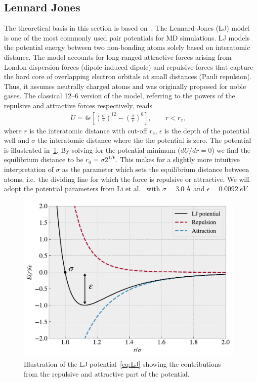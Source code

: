 \subsection{Lennard Jones}\label{sec:LJ}
The theoretical basis in this section is based on~\cite{docs_lammps_LJ,
C9CP05445F, chem_libretexts_LJ}. The Lennard-Jones (\acrshort{LJ}) model is one of the most commonly used pair potentials for \acrshort{MD} simulations. \acrshort{LJ} models the potential energy between two non-bonding atoms solely based on interatomic distance. The model accounts for long-ranged attractive forces arising from London dispersion forces (dipole-induced dipole) and repulsive forces that capture the hard core of overlapping electron orbitals at small distances (Pauli repulsion). Thus, it assumes neutrally charged atoms and was originally proposed for noble gases. The classical 12--6 version of the model, referring to the powers of the repulsive and attractive forces respectively, reads
\begin{align}
  U = 4\epsilon \left[\left(\frac{\sigma}{r}\right)^{12} - \left(\frac{\sigma}{r}\right)^6 \right ], \qquad r < r_c,
  \label{eq:LJ}
\end{align}
where $r$ is the interatomic distance with cut-off $r_c$, $\epsilon$ is the
depth of the potential well and $\sigma$ the interatomic distance where the
the potential is zero. The potential is illustrated in~\cref{fig:LJ_pot}. By solving for the potential minimum ($dU/dr = 0$) we find the equilibrium distance to be $r_0 = \sigma 2^{1/6}$. This makes for a slightly more intuitive interpretation of $\sigma$ as the parameter which sets the equilibrium distance between atoms, i.e.\ the dividing line for which the force is repulsive or attractive. We will adopt the potential parameters from Li et al.~\cite{li_evolving_2016} with $\sigma = \SI{3.0}{\text{Å}}$ and $\epsilon = \SI{0.0092}{eV}$.

\begin{figure}[H]
  \centering
  \includegraphics[width=0.6\linewidth]{figures/theory/LJ_pot.pdf}
  \caption{Illustration of the \acrshort{LJ} potential~\cref{eq:LJ} showing the contributions from the repulsive and attractive part of the potential.}
  \label{fig:LJ_pot}
\end{figure}



